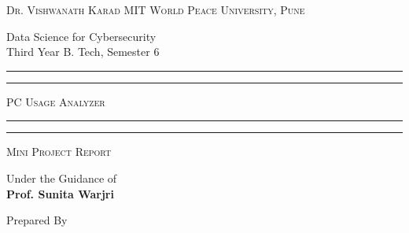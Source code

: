 \documentclass[openany]{report}
\begin{document}
\begin{titlepage}
    \centering


    \huge\textsc{
        Dr. Vishwanath Karad MIT World Peace University, Pune
    }\\

    \vspace{0.75\baselineskip} %

    \LARGE{
        Data Science for Cybersecurity\\
        Third Year B. Tech, Semester 6\\
    }

    \vfill %


    \rule{\textwidth}{1.6pt}\vspace*{-\baselineskip}\vspace*{2pt}
    \rule{\textwidth}{0.6pt}
    \vspace{0.75\baselineskip} %



    \huge{\textsc{
            PC Usage Analyzer
        }} \\



    \vspace{0.5\baselineskip} %
    \rule{\textwidth}{0.6pt}\vspace*{-\baselineskip}\vspace*{2.8pt}
    \rule{\textwidth}{1.6pt}

    \vspace{1\baselineskip} %


    \LARGE\textsc{
        Mini Project Report
    } %


    \vspace{0.5\baselineskip} %
    Under the Guidance of\\
    \Large{
        \textbf{Prof. Sunita Warjri}
    }
    \vfill

    Prepared By
    \vspace{0.5\baselineskip} %


\end{titlepage}
\end{document}
